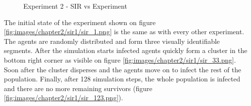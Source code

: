 
\begin{figure}[H]
    \centering
    \hspace*{\fill}
    \caption{Experiment 2 - SIR vs Experiment} \label{fig:experiment1-diagrams}
\end{figure}

The initial state of the experiment shown on figure \ref{fig:images/chapter2/sir1/sir_1.png} is the same as with every other experiment.
The agents are randomly distributed and form three visually identifiable segments.
After the simulation starts infected agents quickly form a cluster in the bottom right corner as visible on figure \ref{fig:images/chapter2/sir1/sir_33.png}.
Soon after the cluster disperses and the agents move on to infect the rest of the population.
Finally, after 128 simulation steps, the whole population is infected and there are no more remaining survivors (figure \ref{fig:images/chapter2/sir1/sir_123.png}).

